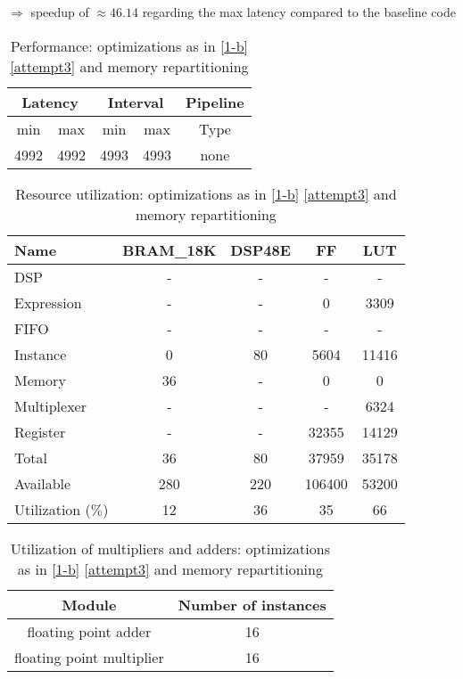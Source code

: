 \documentclass{article}
\begin{document}
$\Rightarrow$ speedup of $\approx 46.14 $ regarding the max latency compared to the baseline code
	\begin{table}[H]
		\centering
		\begin{tabular}{ccccc}
			\multicolumn{2}{c}{Latency} & \multicolumn{2}{c}{Interval} & Pipeline\\
			\hline
			min  &   max  &   min  &   max  &   Type  \\
			4992&  4992&  4993&  4993&   none 
		\end{tabular}
		\caption{Performance:  optimizations as in \ref{1-b} \ref{attempt3} and memory repartitioning}
		\label{1-c-perf-table}
	\end{table}

	\begin{table}[H]
		\centering
		\begin{tabular}{lcccc}
			Name      & BRAM\_18K& DSP48E&   FF   &  LUT  \\
			\hline
			DSP              &        -&      -&       -&      -\\
			Expression       &        -&      -&       0&   3309\\
			FIFO             &        -&      -&       -&      -\\
			Instance         &        0&     80&    5604&  11416\\
			Memory           &       36&      -&       0&      0\\
			Multiplexer      &        -&      -&       -&   6324\\
			Register         &        -&      -&   32355&  14129\\
			\hline
			Total            &       36&     80&   37959&  35178\\
			Available        &      280&    220&  106400&  53200\\
			\hline
			Utilization ($\%$)  &       12&     36&      35&     66
		\end{tabular}
		\caption{Resource utilization: optimizations as in \ref{1-b} \ref{attempt3} and memory repartitioning}
		\label{1-c-resources}
	\end{table}

	\begin{table}[H]
		\centering
		\begin{tabular}{cc}
			Module & Number of instances \\
			\hline
			floating point adder & 16 \\
			floating point multiplier & 16
		\end{tabular}
		\caption{Utilization of multipliers and adders: optimizations as in \ref{1-b} \ref{attempt3} and memory repartitioning}
		\label{1-c-resources-arithmetic}
	\end{table}
\end{document}
